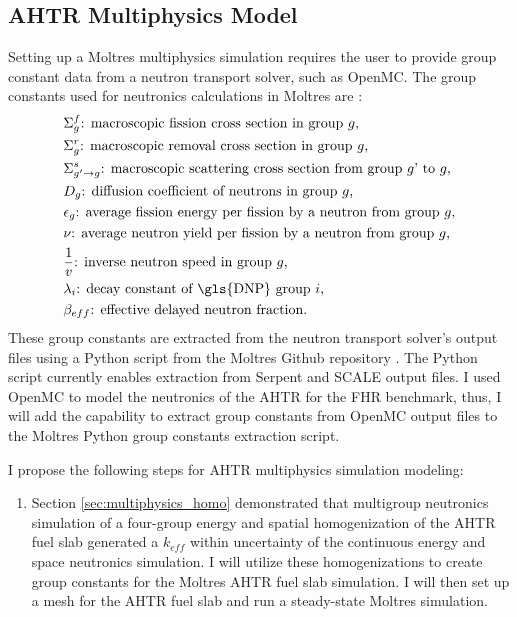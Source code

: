 \subsection{AHTR Multiphysics Model}
Setting up a Moltres multiphysics simulation requires the user to provide group 
constant data from a neutron transport solver, such as OpenMC. 
The group constants used for neutronics calculations in Moltres are 
\cite{lindsay_introduction_2018,park_advancement_2020}: 
\begin{align*}
  &\Sigma^f_{g} \text{: macroscopic fission cross section in group $g$,} \\
  &\Sigma^r_{g} \text{: macroscopic removal cross section in group $g$,} \\
  &\Sigma^s_{g' \rightarrow g} \text{: macroscopic scattering cross section
  from group $g$' to $g$,} \\
  &D_g \text{: diffusion coefficient of neutrons in group $g$,} \\
  &\epsilon_g \text{: average fission energy per fission by a neutron from
  group $g$,} \\
  &\nu \text{: average neutron yield per fission by a neutron from group
  $g$,} \\
  &\frac{1}{v} \text{: inverse neutron speed in group $g$,} \\
  &\lambda_i \text{: decay constant of \gls{DNP} group $i$,} \\
  &\beta_{eff} \text{: effective delayed neutron fraction.} \\
\end{align*}
These group constants are extracted from the neutron transport solver's output files 
using a Python script from the Moltres Github repository \cite{lindsay_moltres_2017}. 
The Python script currently enables extraction from Serpent 
\cite{leppanen_serpent_2014} and SCALE \cite{bucholz_scale:_1982} output files.
I used OpenMC to model the neutronics of the \gls{AHTR} for the \gls{FHR} benchmark, 
thus, I will add the capability to extract group constants from OpenMC output 
files to the Moltres Python group constants extraction script. 

I propose the following steps for \gls{AHTR} multiphysics simulation modeling: 
\begin{enumerate}
  \item Section \ref{sec:multiphysics_homo} demonstrated that multigroup neutronics 
  simulation of a four-group energy and spatial homogenization of the \gls{AHTR} 
  fuel slab generated a $k_{eff}$ within uncertainty of the continuous energy and 
  space neutronics simulation. I will utilize these homogenizations to create 
  group constants for the Moltres \gls{AHTR} fuel slab simulation. I will then 
  set up a mesh for the \gls{AHTR} fuel slab and run a steady-state Moltres 
  simulation. 
\end{enumerate}

